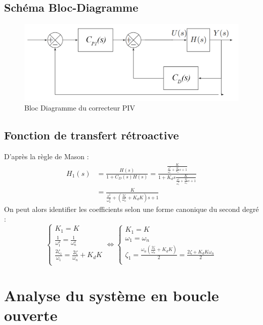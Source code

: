 \documentclass{article}
\begin{document}
\subsection{Schéma Bloc-Diagramme}
\begin{figure}[h]
    \centering
    \includegraphics[width=\linewidth]{piv.png}
    \caption{Bloc Diagramme du correcteur PIV}
    \label{fig:diagram}
\end{figure}
\subsection{Fonction de transfert rétroactive}
D'après la règle de Mason :
\begin{align*}
    H_1(s)&=\frac{H(s)}{1+C_D(s)H(s)}=\frac{\frac{K}{\frac{s^2}{\omega_n^2}+\frac{2\zeta}{\omega_n}s+1}}{1+K_ds\frac{K}{\frac{s^2}{\omega_n^2}+\frac{2\zeta}{\omega_n}s+1}}\\
    &=\frac{K}{\frac{s^2}{\omega_n^2}+(\frac{2\zeta}{\omega_n}+K_dK)s+1}
\end{align*}
On peut alors identifier les coefficients selon une forme canonique du second degré :
\begin{equation*}
    \begin{cases}
        K_1=K\\
        \frac{1}{\omega_1^2}=\frac{1}{\omega_n^2}\\
        \frac{2\zeta_1}{\omega_1}=\frac{2\zeta}{\omega_n}+K_dK\\
    \end{cases}
    \Leftrightarrow
    \begin{cases}
        K_1=K\\
        \omega_1=\omega_n\\
        \zeta_1=\frac{\omega_n(\frac{2\zeta}{\omega_n}+K_dK)}{2}=\frac{2\zeta+K_dK\omega_n}{2}\\
    \end{cases}
\end{equation*}
\section{Analyse du système en boucle ouverte}
\end{document}
